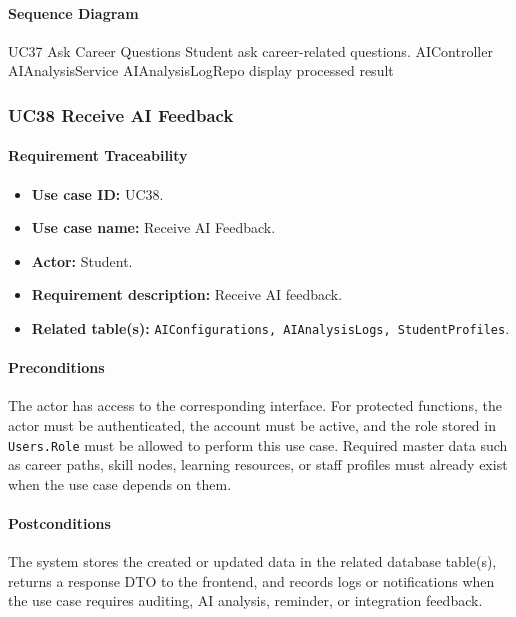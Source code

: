 \paragraph{Sequence Diagram}

\SequenceDiagram
{UC37 Ask Career Questions}
{Student}
{ask career-related questions.}
{AIController}
{AIAnalysisService}
{AIAnalysisLogRepo}
{display processed result}

\subsubsection{UC38 Receive AI Feedback}

\paragraph{Requirement Traceability}

\begin{itemize}
    \item \textbf{Use case ID:} UC38.
    \item \textbf{Use case name:} Receive AI Feedback.
    \item \textbf{Actor:} Student.
    \item \textbf{Requirement description:} Receive AI feedback.
    \item \textbf{Related table(s):} \texttt{AIConfigurations, AIAnalysisLogs, StudentProfiles}.
\end{itemize}

\paragraph{Preconditions}

The actor has access to the corresponding interface. For protected functions, the actor must be authenticated, the account must be active, and the role stored in \texttt{Users.Role} must be allowed to perform this use case. Required master data such as career paths, skill nodes, learning resources, or staff profiles must already exist when the use case depends on them.

\paragraph{Postconditions}

The system stores the created or updated data in the related database table(s), returns a response DTO to the frontend, and records logs or notifications when the use case requires auditing, AI analysis, reminder, or integration feedback.

